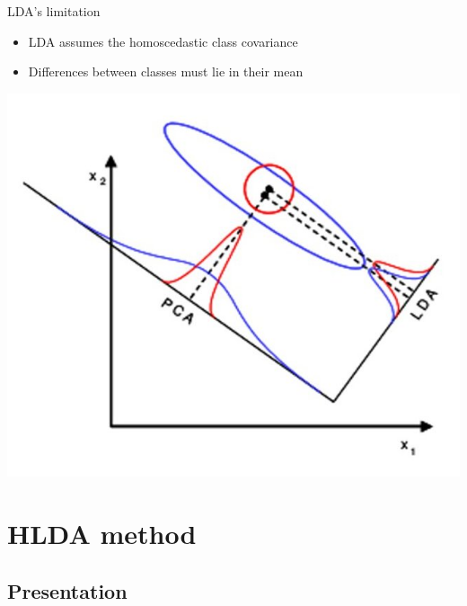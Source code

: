 \documentclass[smaller,pdf,svgnames]{beamer}
\begin{document}
\begin{frame}
  \begin{block}{LDA's limitation}
    \begin{itemize}
      \item LDA assumes the homoscedastic class covariance
      \item Differences between classes must lie in their mean
    \end{itemize}
  \end{block}

  \centering\includegraphics[scale=0.4]{../img/limitation_lda}

\end{frame}

\section{HLDA method}

\subsection{Presentation}
\end{document}
